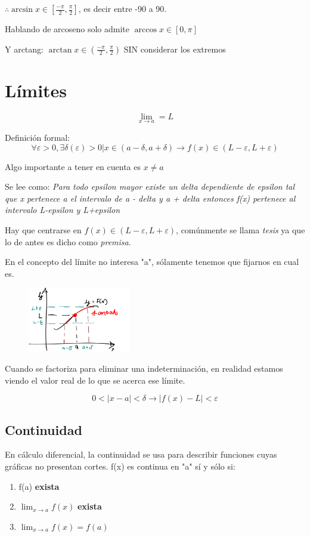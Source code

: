\documentclass[letterpaper,12pt]{article}
\begin{document}
\begin{sloppypar}
$\displaystyle \therefore \arcsin x\in [\frac{-\pi}{2},\frac{\pi}{2}] $, es decir entre -90 a 90.

Hablando de arcoseno solo admite $\arccos x\in [0, \pi]$

Y arctang: $\displaystyle \arctan x\in ( {\frac{-\pi}{2},\frac{\pi}{2}}) $ SIN considerar los extremos

\section{Límites}
$$\displaystyle \lim_{x \to a} = L$$ 

Definición formal: 
$$\forall \varepsilon > 0, \exists\delta(\varepsilon) > 0 |   x \in (a - \delta, a + \delta)  \longrightarrow  f(x)\in (L - \varepsilon, L + \varepsilon)$$

Algo importante a tener en cuenta es $x\neq a$

Se lee como: \textit{Para todo epsilon mayor existe un delta dependiente de epsilon tal que x pertenece a el intervalo de a - delta y a + delta entonces f(x) pertenece al intervalo L-epsilon y L+epsilon}

Hay que centrarse en $f(x)\in (L - \varepsilon, L + \varepsilon)$, comúnmente se llama \textit{tesis} ya que lo de antes es dicho como \textit{premisa}.

En el concepto del límite no interesa "a", sólamente tenemos que fijarnos en cual es. 

\begin{figure}[H]
    \centering
    \includegraphics[width=0.4\textwidth]{lim.PNG}
\end{figure}

Cuando se factoriza para eliminar una indeterminación, en realidad estamos viendo el valor real de lo que se acerca ese límite. 

$$0 < |x-a| < \delta \longrightarrow |f(x) - L| < \varepsilon $$
\subsection{Continuidad}
En cálculo diferencial, la continuidad se usa para describir funciones cuyas gráficas no presentan cortes.
f(x) es continua en "a" sí y sólo si:
\begin{center}
    \begin{enumerate}
        \item f(a) \textbf{exista}
        \item $\lim_{x \to a} f(x)$ \textbf{exista}
        \item $\lim_{x \to a} f(x) = f(a)$ 
    \end{enumerate}
\end{center}


\end{sloppypar}
\end{document}
